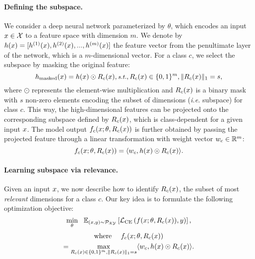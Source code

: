 \paragraph{Defining the subspace.} We consider a deep neural network parameterized by $\theta$, which encodes an input $\*x \in \mathcal{X}$ to a feature space with dimension $m$. We denote by $ h(\*x) = [h^{(1)}(\*x), h^{(2)}(\*x),...,h^{(m)}(\*x) ]$ the feature vector from the penultimate layer of the network, which is a $m$-dimensional vector. For a class $c$, we select the subspace by masking the original feature:
\begin{equation}
\small
    h_{\text{masked}}(\*x) = h(\*x) \odot R_c(\*x), \textit{s.t.}, R_c(\*x)\in \{0,1\}^m, \|R_c(\*x)\|_1 = s,
\end{equation}
where $\odot$ represents the element-wise multiplication and  $R_c(\*x)$  is a binary mask with $s$ non-zero elements encoding the subset of dimensions (\emph{i.e.} subspace) for class $c$. This way, the high-dimensional features can be projected onto the corresponding subspace defined by $R_c(\*x)$, which is class-dependent for a given input $\*x$. The model output $f_c(\*x;\theta, R_c(\*x))$ is further obtained by passing the projected feature through a linear transformation with weight vector $\*w_c \in \mathbb{R}^m$:
\begin{equation}
\label{eq:orig}
    f_c(\*x; \theta, R_c(\*x)) = \langle \*w_c, h(\*x) \odot R_c(\*x) \rangle .
\end{equation}

\paragraph{Learning subspace via relevance.}
Given an input $\*x$, we now describe how to identify $R_c(\*x)$, the subset of most \emph{relevant} dimensions for a class $c$. Our key idea is to formulate the following  optimization objective:
\begin{equation}
    \min_\theta ~~\mathbb{E}_{(\*x,y)\sim\mathcal{P}_{\mathcal{X}\mathcal{Y}}} \left[\mathcal{L}_{\text{CE}}\left({{f}}(\*x;\theta, R_c(\*x)), y\right)\right],
\end{equation}
\begin{multline}
     \text{where ~~~}f_c(\*x; \theta, R_c(\*x)) \\
    = \max_{R_c(\*x)\in \{0,1\}^m, \|R_c(\*x)\|_1 = s} \langle \*w_c, h(\*x) \odot R_c(\*x) \rangle. 
    \label{eq:relevance}
\end{multline}
      

